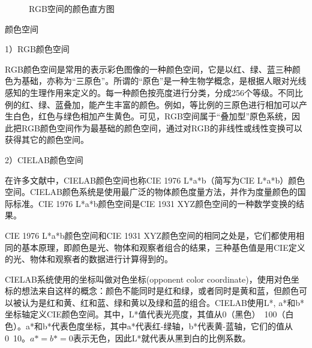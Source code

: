 \documentclass[12pt]{article}
\begin{document}
\begin{figure}
  \centering 
  \caption{RGB空间的颜色直方图}
  \label{fig: RGBhistogram} %
\end{figure}

颜色空间

1）RGB颜色空间

RGB颜色空间是常用的表示彩色图像的一种颜色空间，它是以红、绿、蓝三种颜色为基础，亦称为“三原色”。所谓的“原色”是一种生物学概念，是根据人眼对光线感知的生理作用来定义的。每一种颜色按亮度进行分类，分成256个等级。不同比例的红、绿、蓝叠加，能产生丰富的颜色。例如，等比例的三原色进行相加可以产生白色，红色与绿色相加产生黄色。可见，RGB空间属于“叠加型”原色系统，因此把RGB颜色空间作为最基础的颜色空间，通过对RGB的非线性或线性变换可以获得其它的颜色空间。

2）CIELAB颜色空间

在许多文献中，CIELAB颜色空间也称CIE 1976 L*a*b（简写为CIE L*a*b）颜色空间。CIELAB颜色系统是使用最广泛的物体颜色度量方法，并作为度量颜色的国际标准。CIE 1976 L*a*b颜色空间是CIE 1931 XYZ颜色空间的一种数学变换的结果。

CIE 1976 L*a*b颜色空间和CIE 1931 XYZ颜色空间的相同之处是，它们都使用相同的基本原理，即颜色是光、物体和观察者组合的结果，三种基色值是用CIE定义的光、物体和观察者的数据进行计算得到的。

CIELAB系统使用的坐标叫做对色坐标(opponent color coordinate)，使用对色坐标的想法来自这样的概念：颜色不能同时是红和绿，或者同时是黄和蓝，但颜色可以被认为是红和黄、红和蓝、绿和黄以及绿和蓝的组合。CIELAB使用L*, a*和b*坐标轴定义CIE颜色空间。其中，L*值代表光亮度，其值从0（黑色）~100（白色）。a*和b*代表色度坐标，其中a*代表红-绿轴，b*代表黄-蓝轴，它们的值从0~10。$a*=b*=0$表示无色，因此L*就代表从黑到白的比例系数。
\end{document}
